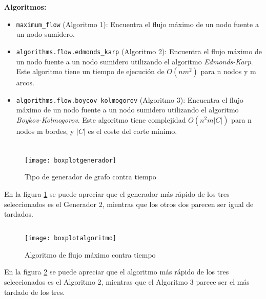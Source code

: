 \documentclass[a4paper, 11pt]{article}
\begin{document}
\textbf{Algoritmos:}
\begin{itemize}
\item \texttt{maximum\_flow} (Algoritmo 1): Encuentra el flujo máximo de un nodo fuente a un nodo sumidero.
\item \texttt{algorithms.flow.edmonds\_karp} (Algoritmo 2): Encuentra el flujo máximo de un nodo fuente a un nodo sumidero utilizando el algoritmo \textit{Edmonds-Karp}. Este algoritmo tiene un tiempo de ejecución de \textbf{$O({nm}^{2})$} para n nodos y m arcos.
\item \texttt{algorithms.flow.boycov\_kolmogorov} (Algoritmo 3): Encuentra el flujo máximo de un nodo fuente a un nodo sumidero utilizando el algoritmo \textit{Boykov-Kolmogorov}. Este algoritmo tiene complejidad $O(n^{2}m|C|)$ para n nodos m bordes, y $|C|$ es el coste del corte mínimo.
\end{itemize}


\section*{}

\subsection*{}
\begin{figure}[H]
\centering
\texttt{[image: boxplotgenerador]}
\caption{Tipo de generador de grafo contra tiempo} \label{figure1}
\end{figure}
En la figura \ref{figure1} se puede apreciar que el generador más rápido de los tres seleccionados es el Generador 2, mientras que los otros dos parecen ser igual de tardados.


\subsection*{}
\begin{figure}[H]
\centering
\texttt{[image: boxplotalgoritmo]}
\caption{Algoritmo de flujo máximo contra tiempo} \label{figure2}
\end{figure}
En la figura \ref{figure2} se puede apreciar que el algoritmo más rápido de los tres seleccionados es el Algoritmo 2, mientras que el Algoritmo 3 parece ser el más tardado de los tres.
\end{document}
